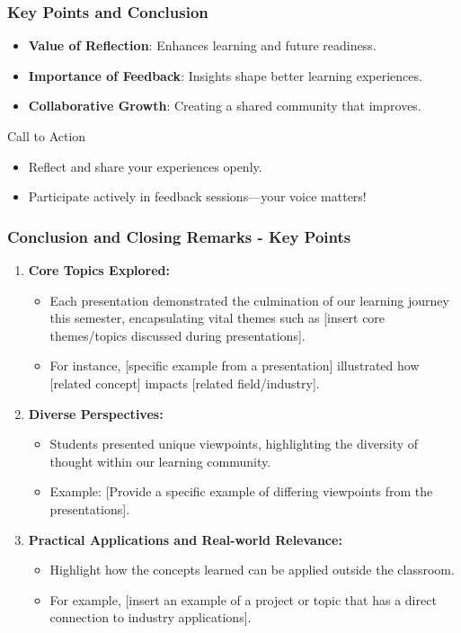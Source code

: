 \documentclass[aspectratio=169]{beamer}
\begin{document}
\begin{frame}[fragile]
  \frametitle{Key Points and Conclusion}
  \begin{itemize}
    \item \textbf{Value of Reflection}: Enhances learning and future readiness.
    \item \textbf{Importance of Feedback}: Insights shape better learning experiences.
    \item \textbf{Collaborative Growth}: Creating a shared community that improves.
  \end{itemize}
  \begin{block}{Call to Action}
    \begin{itemize}
      \item Reflect and share your experiences openly.
      \item Participate actively in feedback sessions—your voice matters!
    \end{itemize}
  \end{block}
\end{frame}

\begin{frame}[fragile]
  \frametitle{Conclusion and Closing Remarks - Key Points}

  \begin{enumerate}
    \item \textbf{Core Topics Explored:}
      \begin{itemize}
        \item Each presentation demonstrated the culmination of our learning journey this semester, encapsulating vital themes such as [insert core themes/topics discussed during presentations].
        \item For instance, [specific example from a presentation] illustrated how [related concept] impacts [related field/industry].
      \end{itemize}

    \item \textbf{Diverse Perspectives:}
      \begin{itemize}
        \item Students presented unique viewpoints, highlighting the diversity of thought within our learning community.
        \item Example: [Provide a specific example of differing viewpoints from the presentations].
      \end{itemize}

    \item \textbf{Practical Applications and Real-world Relevance:}
      \begin{itemize}
        \item Highlight how the concepts learned can be applied outside the classroom.
        \item For example, [insert an example of a project or topic that has a direct connection to industry applications].
      \end{itemize}
  \end{enumerate}
\end{frame}
\end{document}

